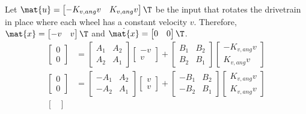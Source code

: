 Let $\mat{u} =
\begin{bmatrix}
  -K_{v,ang} v & K_{v,ang} v
\end{bmatrix}\T$ be the input that rotates the drivetrain in place where each
wheel has a constant velocity $v$. Therefore, $\mat{x} =
\begin{bmatrix}
  -v & v
\end{bmatrix}\T$ and $\dot{\mat{x}} =
\begin{bmatrix}
  0 & 0
\end{bmatrix}\T$.
\begin{align*}
  \begin{bmatrix}
    0 \\
    0
  \end{bmatrix} &=
    \begin{bmatrix}
      A_1 & A_2 \\
      A_2 & A_1
    \end{bmatrix}
    \begin{bmatrix}
      -v \\
      v
    \end{bmatrix} +
    \begin{bmatrix}
      B_1 & B_2 \\
      B_2 & B_1
    \end{bmatrix}
    \begin{bmatrix}
      -K_{v,ang} v \\
      K_{v,ang} v
    \end{bmatrix} \\
  \begin{bmatrix}
    0 \\
    0
  \end{bmatrix} &=
    \begin{bmatrix}
      -A_1 & A_2 \\
      -A_2 & A_1
    \end{bmatrix}
    \begin{bmatrix}
      v \\
      v
    \end{bmatrix} +
    \begin{bmatrix}
      -B_1 & B_2 \\
      -B_2 & B_1
    \end{bmatrix}
    \begin{bmatrix}
      K_{v,ang} v \\
      K_{v,ang} v
    \end{bmatrix} \\
  \begin{bmatrix}

\end{bmatrix}
\end{align*}
